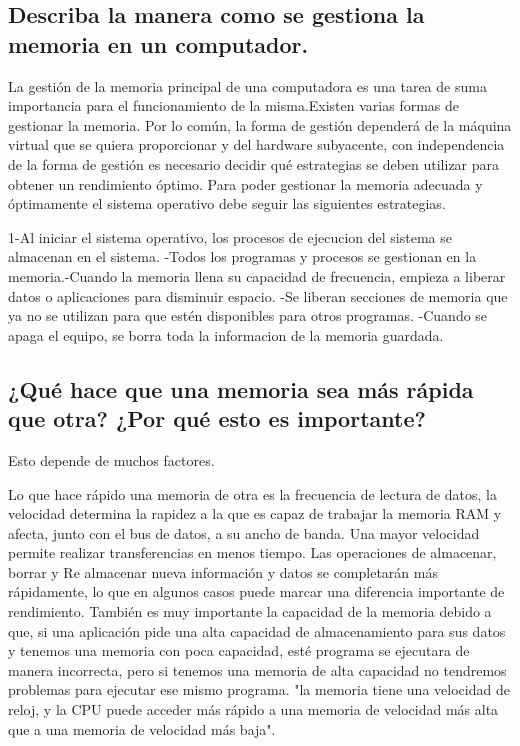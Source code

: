 \documentclass{article}
\begin{document}
\newpage
\subsection{Describa la manera como se gestiona la memoria en un computador.}

La gestión de la memoria principal de una computadora es una tarea de suma importancia para el funcionamiento de la misma.Existen varias formas de gestionar la memoria. Por lo común, la forma de gestión dependerá de la máquina virtual que se quiera proporcionar y del hardware subyacente, con independencia de la forma de gestión es necesario decidir qué estrategias se deben utilizar para obtener un rendimiento óptimo. Para poder gestionar la memoria adecuada y óptimamente el sistema operativo debe seguir las siguientes estrategias. \newline

1-Al iniciar el sistema operativo, los procesos de ejecucion del sistema se almacenan en el sistema. -Todos los programas y procesos se gestionan en la memoria.-Cuando la memoria llena su capacidad de frecuencia, empieza a liberar datos o aplicaciones para disminuir espacio. -Se liberan secciones de memoria que ya no se utilizan para que estén disponibles para otros programas. -Cuando se apaga el equipo, se borra toda la informacion de la memoria guardada.\newline


\subsection{¿Qué hace que una memoria sea más rápida que otra? ¿Por qué esto es importante?}

Esto depende de muchos factores. \newline

Lo que hace rápido una memoria de otra es la frecuencia de lectura de datos, la velocidad determina la rapidez a la que es capaz de trabajar la memoria RAM y afecta, junto con el bus de datos, a su ancho de banda. Una mayor velocidad permite realizar transferencias en menos tiempo. Las operaciones de almacenar, borrar y Re almacenar nueva información y datos se completarán más rápidamente, lo que en algunos casos puede marcar una diferencia importante de rendimiento. También es muy importante la capacidad de la memoria debido a que, si una aplicación pide una alta capacidad de almacenamiento para sus datos y tenemos una memoria con poca capacidad, esté programa se ejecutara de manera incorrecta, pero si tenemos una memoria de alta capacidad no tendremos problemas para ejecutar ese mismo programa.
\cite{mycomputer} "la memoria tiene una velocidad de reloj, y la CPU puede acceder más rápido a una memoria de velocidad más alta que a una memoria de velocidad más baja".
\end{document}
